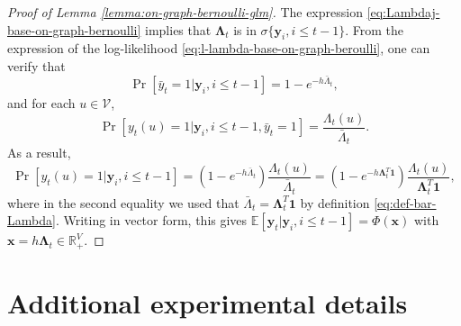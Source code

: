 \documentclass[11pt]{article}
\theoremstyle{remark}
\theoremstyle{plain}
\newcommand{\calV}{\mathcal{V}}
\newcommand{\E}{\mathbb{E}}
\newcommand{\R}{\mathbb{R}}
\begin{document}
%
\begin{proof}[Proof of Lemma \ref{lemma:on-graph-bernoulli-glm}]
The expression \eqref{eq:Lambdaj-base-on-graph-bernoulli} implies that $\mathbf{\Lambda}_t $ is in $\sigma\{ \mathbf{y}_i, i\le  t-1 \}$. 
From the expression of the log-likelihood \eqref{eq:l-lambda-base-on-graph-beroulli},
one can verify that 
\[
\Pr [ \bar{y}_t = 1| \mathbf{y}_i, i\le  t-1 ] = 1- e^{- h \bar{\Lambda}_{t}},
\]
and for each $u\in\calV$, 
\[
\Pr [  y_t(u) =1 | \mathbf{y}_i, i\le  t-1, \bar{y}_t = 1] = \frac{ \Lambda_{t} (u) }{ \bar{\Lambda}_{t}}.
\]
As a result,
\[
\Pr [ {y}_t (u) = 1|  \mathbf{y}_i, i\le  t-1 ] 
= ( 1- e^{- h \bar{\Lambda}_{t}} )\frac{ \Lambda_{t} (u) }{ \bar{\Lambda}_{t}}
= ( 1- e^{- h  \mathbf{\Lambda}_t^T \mathbf{1}  } )\frac{ \Lambda_{t} (u) }{ \mathbf{\Lambda}_t^T \mathbf{1}  },
\] 
where in the second equality we used that $ \bar{\Lambda}_t = \mathbf{\Lambda}_t^T \mathbf{1} $ by definition \eqref{eq:def-bar-Lambda}.
Writing in vector form, this gives
$\E [ \mathbf{y}_t | \mathbf{y}_i, i\le  t-1 ] = \Phi(\boldsymbol x)$ with $\boldsymbol x = h \mathbf{\Lambda}_t \in \R_+^V$.  
\end{proof}



\section{Additional experimental details }
\label{apdx:additional-exp}
\end{document}
